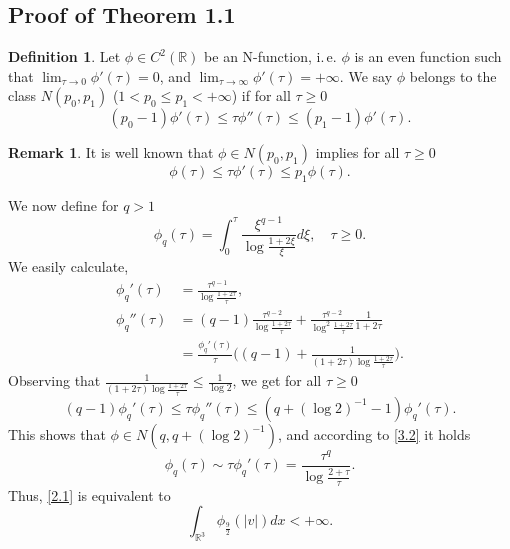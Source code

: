 \documentclass[12pt]{article}
\numberwithin{equation}{section}
\theoremstyle{definition}
\newtheorem{defin}[thm]{Definition}
\newtheorem{rem}[thm]{Remark}
\begin{document}
\subsection {Proof of Theorem 1.1}

\begin{defin}
\label{def3.1}
Let $ \phi \in C^2({\mathbb{R}})$ be an N-function, i.\,e.  $ \phi $ is an even function such that 
$ \lim_{\tau  \to 0} \phi'(\tau) =0 $, and $ \lim_{\tau  \to \infty} \phi' (\tau)= +\infty$. We say $ \phi $ belongs 
to the class $ N(p_0, p_1)$ ($ 1< p_0 \le p_1 < +\infty$) if for all $ \tau  \ge 0$
\begin{equation}
(p_0-1)\phi'(\tau ) \le \tau \phi ''(\tau ) \le (p_1-1) \phi' (\tau ).
\label{3.1}
\end{equation}

\end{defin}

\begin{rem}
It is well known that $ \phi \in N(p_0, p_1)$ implies for all $ \tau \ge 0$
\begin{equation}
\phi(\tau ) \le \tau \phi '(\tau ) \le p_1\phi(\tau ).
\label{3.2}
\end{equation}
\end{rem}

\hspace{0.5cm}
We now define for   $ q>1$ 
\[
\phi _q(\tau ) =  {\int\limits}^{\tau }_{0} \frac{\xi ^{ q-1}}{ \log \frac{1+ 2\xi  }{\xi  }}  d\xi,\quad \tau \ge 0.  
\]
We easily calculate,
\begin{align*}
\phi_q '(\tau ) &= \frac{\tau ^{ q-1}}{ \log \frac{1+ 2\tau  }{\tau  }},\quad  
\\
\phi_q ''(\tau ) &= (q-1) \frac{\tau ^{ q-2}}{ \log \frac{1+ 2\tau }{\tau }} + \frac{\tau ^{ q-2}}{ \log^2 \frac{1+ 2\tau  }{\tau  }} \frac{1}{1+2\tau } 
\\
&= \frac{\phi_q '(\tau )}{\tau }\bigg(
(q-1) + \frac{1}{(1+2\tau ) \log \frac{1+2\tau }{\tau }}\bigg). 
\end{align*}
 Observing that $ \frac{1}{(1+2\tau ) \log \frac{1+2\tau }{\tau }} \le \frac{1}{\log 2}$, we get  for all $ \tau \ge 0$
\begin{equation}
(q-1) \phi_q '(\tau ) \le \tau \phi_q ''(\tau ) \le  (q+ (\log 2)^{ -1} -1)  \phi_q '(\tau ).
\label{3.3}
\end{equation}
This shows that $ \phi \in N(q, q+ (\log 2)^{ -1})$, and according to \eqref{3.2} it holds  
\begin{equation}
\phi_q(\tau ) \sim \tau \phi_q '(\tau ) = \frac{\tau ^{ q}}{ \log \frac{2+ \tau  }{\tau  }}. 
\label{3.4}
\end{equation}
Thus, \eqref{2.1} is equivalent to  
\begin{equation}
{\int\limits}_{ {\mathbb{R}}^3} \phi_{ \frac92} (| {v} |) dx < +\infty.   
\label{3.5}
\end{equation}
\end{document}
